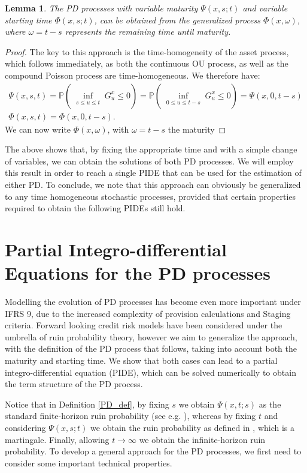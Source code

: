 \documentclass[11pt,reqno]{article}
\newtheorem{lemma}[theorem]{Lemma}
\theoremstyle{definition}
\begin{document}
\begin{lemma}
The PD processes with variable maturity $\Psi(x,s;t)$ and variable starting time $\Phi(x,s;t)$, can be obtained from the generalized process $\Phi(x,\omega)$, where $\omega = t-s$ represents the remaining time until maturity.
\end{lemma}
\begin{proof}

\par The key to this approach is the time-homogeneity of the asset process, which follows immediately, as both the continuous OU process, as well as the compound Poisson process are time-homogeneous. %
We therefore have:
\begin{align}\label{equiv}
	\Psi(x,s,t) = \mathbb{P}(\inf_{\substack{s \leq u \leq t}} G_u^x \leq 0) =\mathbb{P}(\inf_{\substack{0 \leq u \leq t-s}} G_u^x \leq 0) = \Psi(x,0,t-s)\\
	\Phi(x,s,t) = \Phi(x,0,t-s).
\end{align}
We can now write $\Phi(x,\omega)$, with $\omega =t-s$ the maturity 
\end{proof}
 The above shows that, by fixing the appropriate time and with a simple change of variables, we can obtain the solutions of both PD processes. We will employ this result in order to reach a single PIDE that can be used for the estimation of either PD. To conclude, we note that this approach can obviously be generalized to any time homogeneous stochastic processes, provided that certain properties required to obtain the following PIDEs still hold.

\section{Partial Integro-differential Equations for the PD processes}
 Modelling the evolution of PD processes has become even more important under IFRS 9, due to the increased complexity of provision calculations and Staging criteria. Forward looking credit risk models have been considered under the umbrella of ruin probability theory, however we aim to generalize the approach, with the definition of the PD process that follows, taking into account both the maturity and starting time. We show that both cases can lead to a partial integro-differential equation (PIDE), which can be solved numerically to obtain the term structure of the PD process.
\par Notice that in Definition \ref{PD_def}, by fixing $s$ we obtain $\Psi(x,t;s)$ as the standard finite-horizon ruin probability (see e.g. \cite{mishura2016ruin}), whereas by fixing $t$ and considering $\Psi(x,s;t)$ we obtain the ruin probability as defined in \cite{moller1995stochastic}, which is a martingale. Finally, allowing $t \rightarrow \infty$ we obtain the infinite-horizon ruin probability.
To develop a general approach for the PD processes, we first need to consider some important technical properties.
\end{document}
